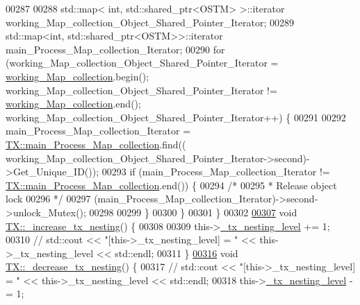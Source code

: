 \begin{DoxyCode}
00287     
00288     std::map< int, std::shared\_ptr<OSTM> >::iterator working\_Map\_collection\_Object\_Shared\_Pointer\_Iterator;
00289     std::map<int, std::shared\_ptr<OSTM>>::iterator main\_Process\_Map\_collection\_Iterator;
00290     \textcolor{keywordflow}{for} (working\_Map\_collection\_Object\_Shared\_Pointer\_Iterator = 
      \hyperlink{class_t_x_a81aafda16e2f20e36ec6c68e584668ff_a81aafda16e2f20e36ec6c68e584668ff}{working\_Map\_collection}.begin(); working\_Map\_collection\_Object\_Shared\_Pointer\_Iterator
       != \hyperlink{class_t_x_a81aafda16e2f20e36ec6c68e584668ff_a81aafda16e2f20e36ec6c68e584668ff}{working\_Map\_collection}.end(); 
      working\_Map\_collection\_Object\_Shared\_Pointer\_Iterator++) \{
00291 
00292             main\_Process\_Map\_collection\_Iterator = 
      \hyperlink{class_t_x_a1a45d726894190695314464d7cd97c29_a1a45d726894190695314464d7cd97c29}{TX::main\_Process\_Map\_collection}.find((
      working\_Map\_collection\_Object\_Shared\_Pointer\_Iterator->second)->Get\_Unique\_ID());
00293             \textcolor{keywordflow}{if} (main\_Process\_Map\_collection\_Iterator != 
      \hyperlink{class_t_x_a1a45d726894190695314464d7cd97c29_a1a45d726894190695314464d7cd97c29}{TX::main\_Process\_Map\_collection}.end()) \{
00294                 \textcolor{comment}{/*}
00295 \textcolor{comment}{                 * Release object lock}
00296 \textcolor{comment}{                 */}
00297                 (main\_Process\_Map\_collection\_Iterator)->second->unlock\_Mutex();
00298                 
00299             \} 
00300         \}
00301 \}
00302 
\hypertarget{_t_x_8cpp_source.tex_l00307}{}\hyperlink{class_t_x_a1384bdf12d795854b5d32e7f61ffbdb8_a1384bdf12d795854b5d32e7f61ffbdb8}{00307} \textcolor{keywordtype}{void} \hyperlink{class_t_x_a1384bdf12d795854b5d32e7f61ffbdb8_a1384bdf12d795854b5d32e7f61ffbdb8}{TX::\_increase\_tx\_nesting}() \{
00308       
00309     this->\hyperlink{class_t_x_ae8f413fd7f4fea322e7ad3c668f9898e_ae8f413fd7f4fea322e7ad3c668f9898e}{\_tx\_nesting\_level} += 1;
00310     \textcolor{comment}{// std::cout << "[this->\_tx\_nesting\_level] = " << this->\_tx\_nesting\_level << std::endl;}
00311 \}
\hypertarget{_t_x_8cpp_source.tex_l00316}{}\hyperlink{class_t_x_aa3ac499f576326588628ade96b27b4b1_aa3ac499f576326588628ade96b27b4b1}{00316} \textcolor{keywordtype}{void} \hyperlink{class_t_x_aa3ac499f576326588628ade96b27b4b1_aa3ac499f576326588628ade96b27b4b1}{TX::\_decrease\_tx\_nesting}() \{
00317    \textcolor{comment}{// std::cout << "[this->\_tx\_nesting\_level] = " << this->\_tx\_nesting\_level << std::endl;}
00318     this->\hyperlink{class_t_x_ae8f413fd7f4fea322e7ad3c668f9898e_ae8f413fd7f4fea322e7ad3c668f9898e}{\_tx\_nesting\_level} -= 1;

\end{DoxyCode}
